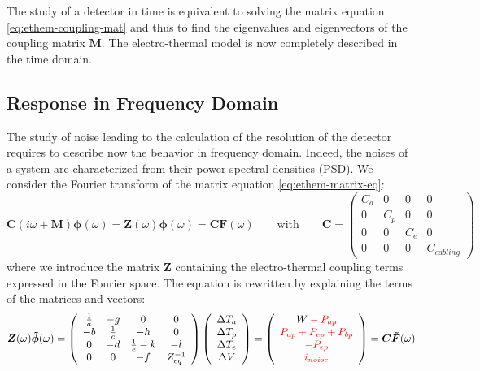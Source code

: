 The study of a detector in time is equivalent to solving the matrix equation \ref{eq:ethem-coupling-mat} and thus to find the eigenvalues and eigenvectors of the coupling matrix $\bm{M}$. The electro-thermal model is now completely described in the time domain.


\subsection{Response in Frequency Domain}
\label{par:ethem-frequency-domain}

The study of noise leading to the calculation of the resolution of the detector requires to describe now the behavior in frequency domain. Indeed, the noises of a system are characterized from their power spectral densities (PSD).
We consider the Fourier transform of the matrix equation \ref{eq:ethem-matrix-eq}:
\begin{equation}
\bm{C} (i\omega + \bm{M})  \bm{\tilde{\phi}}  (\omega) = \bm{Z} (\omega) \bm{\tilde{\phi}} (\omega)  = \bm{C} \bm{\tilde{F}} (\omega) \qquad \textrm{with} \qquad \bm{C} = \left( \begin{array}{cccc}
 C_a&0&0&0 \\
0&C_p&0&0\\
0&0&C_e&0\\
0&0&0&C_{cabling}
\end{array} \right)
\end{equation}
where we introduce the matrix $\bm{Z}$ containing the electro-thermal coupling terms expressed in the Fourier space. The equation is rewritten by explaining the terms of the matrices and vectors: 
\begin{equation}
\label{z-mat}
\bm{Z} (\omega) \bm{\tilde{\phi}} (\omega) =
\left( \begin{array}{cccc}
 \frac{1}{a}&-g&0&0 \\
-b&\frac{1}{c}&-h&0\\
0&-d&\frac{1}{e}-k&-l\\
0&0&-f&Z_{eq}^{-1}
\end{array} \right)
\left( \begin{array}{c}
\Delta T_a\\
\Delta T_p\\
\Delta T_e\\
\Delta V
\end{array} \right)
 =
\left( \begin{array}{c}
W\begingroup\color{red} - P_{ap}\endgroup\\
\begingroup\color{red}  P_{ap} + P_{ep} + P_{bp}\endgroup\\
\begingroup\color{red} - P_{ep}\endgroup\\
\begingroup\color{red}  i_{noise} \endgroup
\end{array} \right)
=  \bm{C} \bm{\tilde{F}} (\omega)
\end{equation}
